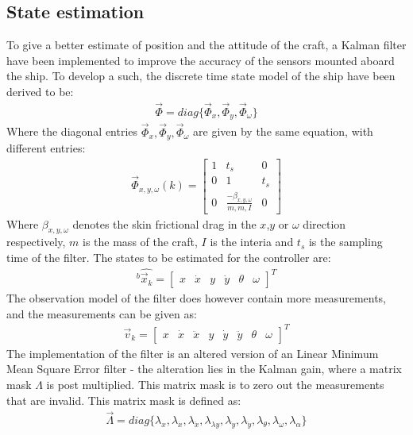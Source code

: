 \documentclass{ifacconf}
\begin{document}
\subsection{State estimation}
To give a better estimate of position and the attitude of the craft, a Kalman filter have been implemented to improve the accuracy of the sensors mounted aboard the ship. To develop a such, the discrete time state model of the ship have been derived to be:
\begin{align}
\vec{\Phi} = diag\{\vec{\Phi} _x,\vec{\Phi} _y,\vec{\Phi} _\omega\}
\end{align}
Where the diagonal entries $\vec{\Phi} _x,\vec{\Phi} _y,\vec{\Phi} _\omega$ are given by the same equation, with different entries:
\begin{align}
\vec{\Phi}_{x,y,\omega}(k) = \begin{bmatrix}
1 & t_s & 0\\
0 & 1 & t_s\\
0 & \frac{-\beta_{x,y,\omega}}{m,m,I} & 0
\end{bmatrix}
\end{align}
Where $\beta_{x,y,\omega}$ denotes the skin frictional drag in the $x$,$y$ or $\omega$ direction respectively, $m$ is the mass of the craft, $I$ is the interia and $t_s$ is the sampling time of the filter. The states to be estimated for the controller are:
\begin{align}
^b\hat{\vec{x}_k} = \begin{bmatrix}
x & \dot{x} & y & \dot{y} & \theta & \omega
\end{bmatrix}^T
\end{align}
The observation model of the filter does however contain more measurements, and the measurements can be given as:
\begin{align}
\vec{v}_k = \begin{bmatrix}
x & \dot{x} & \ddot{x} & y & \dot{y} & \ddot{y} & \theta & \omega
\end{bmatrix}^T
\end{align}
The implementation of the filter is an altered version of an Linear Minimum Mean Square Error filter - the alteration lies in the Kalman gain, where a matrix mask $\Lambda$ is post multiplied. This matrix mask is to zero out the measurements that are invalid. This matrix mask is defined as:
\begin{align}
\vec{\Lambda} = diag\{\lambda_x,\lambda_{\dot{x}},\lambda_{\ddot{x}},\lambda_{\lambda{y}},\lambda_{\dot{y}},\lambda_{\ddot{y}},\lambda_{\theta},\lambda_{\omega},\lambda_{\alpha} \}
\end{align}
\end{document}
